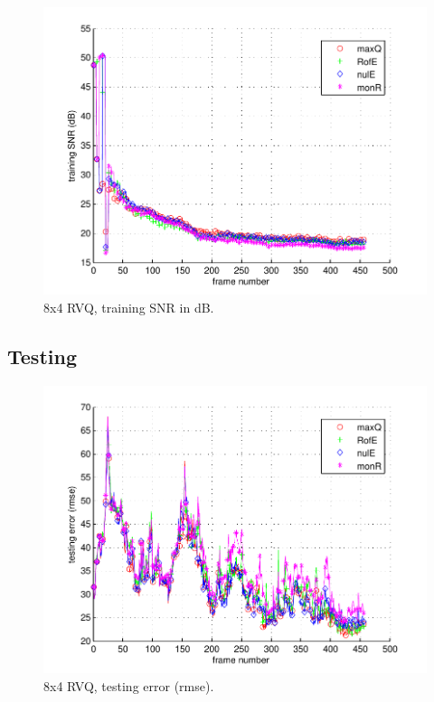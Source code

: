 								\begin{figure}[h!]
								\centering
								\includegraphics[height=0.4\textheight]{thesis/2_davidin300_8_4_1000_trg_SNRdB.pdf}
								\caption{8x4 RVQ, training SNR in dB.}
								\label{fig:2_davidin300_8_4_1000_trg_SNRdB}
								\end{figure}
\clearpage
\newpage
\subsection{Testing}
								\begin{figure}[h!]
								\centering
								\includegraphics[height=0.4\textheight]{thesis/2_davidin300_8_4_1000_tst_rmse.pdf}
								\caption{8x4 RVQ, testing error (rmse).}
								\label{fig:2_davidin300_8_4_1000_tst_rmse}
								\end{figure}



